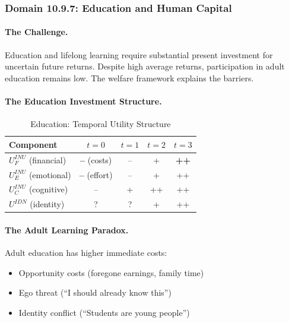 \subsubsection{Domain 10.9.7: Education and Human Capital}
\label{subsubsec:education}

\paragraph{The Challenge.}
Education and lifelong learning require substantial present investment for
uncertain future returns. Despite high average returns, participation in
adult education remains low. The welfare framework explains the barriers.

\paragraph{The Education Investment Structure.}

\begin{table}[htbp]
\centering
\caption{Education: Temporal Utility Structure}
\label{tab:education-temporal}
\renewcommand{\arraystretch}{1.3}
\begin{tabular}{@{}lcccc@{}}
\toprule
\textbf{Component} & $t=0$ & $t=1$ & $t=2$ & $t=3$ \\
\midrule
$U^{INU}_F$ (financial) & \textbf{--} (costs) & -- & + & \textbf{++} \\
$U^{INU}_E$ (emotional) & \textbf{--} (effort) & -- & + & ++ \\
$U^{INU}_C$ (cognitive) & -- & + & ++ & ++ \\
$U^{IDN}$ (identity) & ? & ? & + & ++ \\
\bottomrule
\end{tabular}
\end{table}

\paragraph{The Adult Learning Paradox.}
Adult education has higher immediate costs:
\begin{itemize}
\item Opportunity costs (foregone earnings, family time)
\item Ego threat (``I should already know this'')
\item Identity conflict (``Students are young people'')
\end{itemize}

